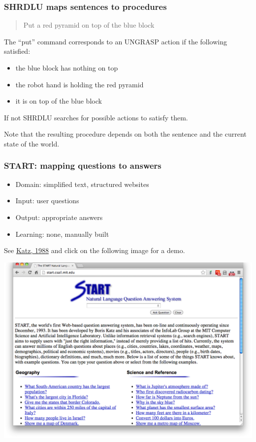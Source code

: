 \documentclass[ignorenonframetext]{beamer}
\begin{document}
\begin{frame}\frametitle{SHRDLU maps sentences to procedures}
\begin{quote}
Put a red pyramid on top of the blue block
\end{quote}

The ``put'' command corresponds to an UNGRASP action if the following satisfied:
\begin{itemize}
\item the blue block has nothing on top
\item the robot hand is holding the red pyramid
\item it is on top of the blue block
\end{itemize}
If not SHRDLU searches for possible actions to satisfy them.
\vspace*{1em}

\color{red} 
Note that the resulting procedure depends on both the sentence
and the current state of the world.
\end{frame}

\begin{frame}\frametitle{START: mapping questions to answers}

\begin{itemize}
\item Domain: simplified text, structured websites
\item Input: user questions
\item Output: appropriate answers
\item Learning: none, manually built
\end{itemize}

See \href{ftp://publications.ai.mit.edu/ai-publications/pdf/AIM-1096.pdf}{Katz, 1988}
and click on the following image for a demo.

\begin{center}
\href{http://start.csail.mit.edu}{
\includegraphics[width=.6\textwidth]{images/katz-start.png}}
\end{center}

\end{frame}
\end{document}
